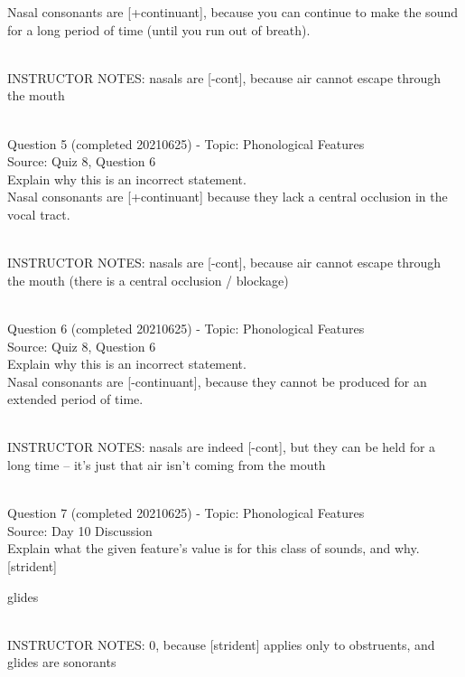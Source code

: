\documentclass[12pt]{article}
\begin{document}
Nasal consonants are {[+continuant]}, because you can continue to make the sound for a long period of time (until you run out of breath).


~\\
INSTRUCTOR NOTES: nasals are [-cont], because air cannot escape through the mouth


~\\

{\large Question 5} (completed 20210625) - Topic: Phonological Features\\
Source: Quiz 8, Question 6\\

Explain why this is an incorrect statement.\\

Nasal consonants are {[+continuant]} because they lack a central occlusion in the vocal tract.


~\\
INSTRUCTOR NOTES: nasals are [-cont], because air cannot escape through the mouth (there is a central occlusion / blockage)


~\\

{\large Question 6} (completed 20210625) - Topic: Phonological Features\\
Source: Quiz 8, Question 6\\

Explain why this is an incorrect statement.\\

Nasal consonants are {[-continuant]}, because they cannot be produced for an extended period of time.


~\\
INSTRUCTOR NOTES: nasals are indeed [-cont], but they can be held for a long time -- it's just that air isn't coming from the mouth


~\\

{\large Question 7} (completed 20210625) - Topic: Phonological Features\\
Source: Day 10 Discussion\\

Explain what the given feature’s value is for this class of sounds, and why.\\

{[strident]}

glides


~\\
INSTRUCTOR NOTES: 0, because [strident] applies only to obstruents, and glides are sonorants
\end{document}

